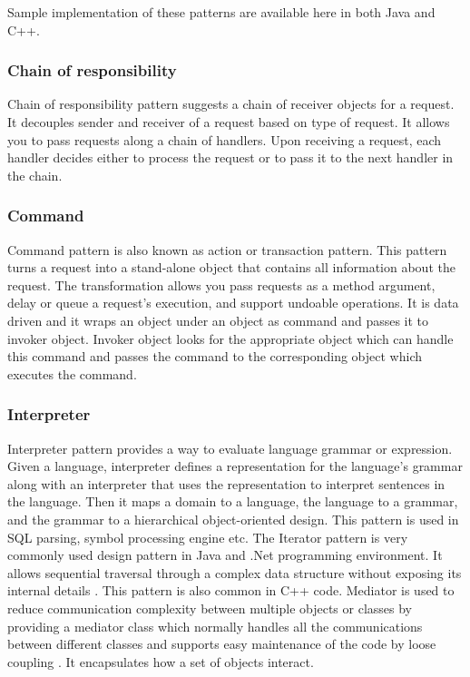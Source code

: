 \documentclass[sigplan,12pt,nonacm=true,review=false]{acmart}
\begin{document}
Sample implementation of these patterns \cite{noauthor_huston_nodate} are available here in both Java and C++.

\subsubsection{Chain of responsibility}
Chain of responsibility pattern suggests a chain of receiver objects for a request. It decouples sender and receiver of a request based on type of request. It allows you to pass requests along a chain of handlers. Upon receiving a request, each handler decides either to process the request or to pass it to the next handler in the chain.

\subsubsection{Command}
Command pattern is also known as action or transaction pattern. This pattern turns a request into a stand-alone object that contains all information about the request. The transformation allows you pass requests as a method argument, delay or queue a request’s execution, and support undoable operations. It is data driven and it wraps an object under an object as command \cite{wendorff_assessment_2001} and passes it to invoker object. Invoker object looks for the appropriate object which can handle this command and passes the command to the corresponding object which executes the command.

\subsubsection{Interpreter}
Interpreter pattern provides a way to evaluate language grammar or expression. Given a language, interpreter defines a representation for the language’s grammar along with an interpreter that uses the representation to interpret sentences in the language. Then it maps a domain to a language, the language to a grammar, and the grammar to a hierarchical object-oriented design. This pattern is used in SQL parsing, symbol processing engine etc. 
The Iterator pattern is very commonly used design pattern in Java and .Net programming environment. It allows sequential traversal through a complex data structure without exposing its internal details \cite{tichy_catalogue_1997}. This pattern is also common in C++ code. Mediator is used to reduce communication complexity between multiple objects or classes by providing a mediator class which normally handles all the communications between different classes and supports easy maintenance of the code by loose coupling \cite{tichy_catalogue_1997}. It encapsulates how a set of objects interact.
\end{document}
